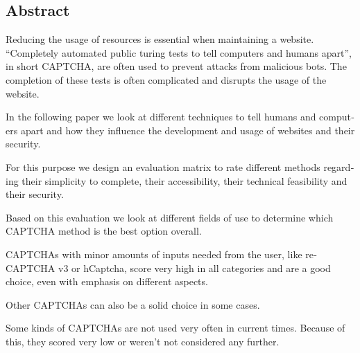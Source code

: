 

\begin{otherlanguage}{american}
	\chapter*{Abstract}
	Reducing the usage of resources is essential when maintaining a website. 
	“Completely automated public turing tests to tell computers and humans apart”, in short CAPTCHA, are often used to prevent attacks from malicious bots. 
	The completion of these tests is often complicated and disrupts the usage of the website. 

	In the following paper we look at different techniques to tell humans and computers apart and how they influence the development and usage of websites and their security. 
	
	For this purpose we design an evaluation matrix to rate different methods regarding their simplicity to complete, their accessibility, their technical feasibility and their security. 
	
	Based on this evaluation we look at different fields of use to determine which CAPTCHA method is the best option overall.

	CAPTCHAs with minor amounts of inputs needed from the user, like reCAPTCHA v3 or hCaptcha, score very high in all categories and are a good choice,
	even with emphasis on different aspects.  

	Other CAPTCHAs can also be a solid choice in some cases.

	Some kinds of CAPTCHAs are not used very often in current times. 
	Because of this, they scored very low or weren't not considered any further.

\end{otherlanguage}
